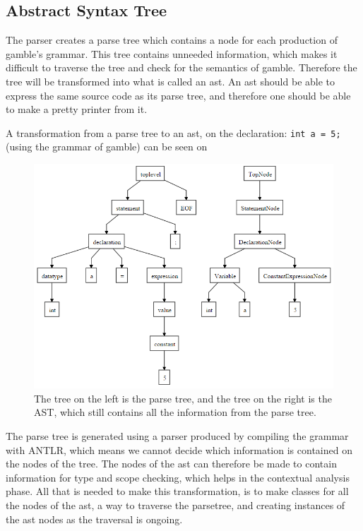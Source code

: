 \subsection*{Abstract Syntax Tree}\label{sec:AST}
The parser creates a parse tree which contains a node for each production of \gls{gamble}'s grammar.
This tree contains unneeded information, which makes it difficult to traverse the tree and check for the semantics of \gls{gamble}.
Therefore the tree will be transformed into what is called an \acrfull{ast}.
An \acrshort{ast} should be able to express the same source code as its parse tree, and therefore one should be able to make a pretty printer from it.


A transformation from a parse tree to an \acrshort{ast}, on the declaration: \texttt{int a = 5;} (using the grammar of \gls{gamble}) can be seen on 

\begin{figure}
		\centering
	 	\includegraphics[width=0.8\linewidth]{figures/Trees/AST.PNG}
		\caption{The tree on the left is the parse tree, and the tree on the right is the AST, which still contains all the information from the parse tree.}\label{image:AST}
\end{figure}

The parse tree is generated using a parser produced by compiling the grammar with ANTLR, which means we cannot decide which information is contained on the nodes of the tree.
The nodes of the \acrshort{ast} can therefore be made to contain information for type and scope checking, which helps in the contextual analysis phase.
All that is needed to make this transformation, is to make classes for all the nodes of the \acrshort{ast}, a way to traverse the parsetree, and creating instances of the \acrshort{ast} nodes as the traversal is ongoing.



